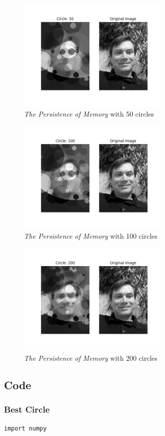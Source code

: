 \documentclass[12pt]{article}
\begin{document}
\begin{figure}[H]
\centering
\noindent\includegraphics[width=0.65\textwidth]{./results/jmcgough_050}
\caption{\textit{The Persistence of Memory} with 50 circles}
\label{fig:jmcgough_050}
\end{figure}

\begin{figure}[H]
\centering
\noindent\includegraphics[width=0.65\textwidth]{./results/jmcgough_100}
\caption{\textit{The Persistence of Memory} with 100 circles}
\label{fig:jmcgough_100}
\end{figure}

\begin{figure}[H]
\centering
\noindent\includegraphics[width=0.65\textwidth]{./results/jmcgough_200}
\caption{\textit{The Persistence of Memory} with 200 circles}
\label{fig:jmcgough_200}
\end{figure}



\newpage
\subsection{Code}
\subsubsection{Best Circle}
\begin{lstlisting}
import numpy
\end{lstlisting}
\end{document}
